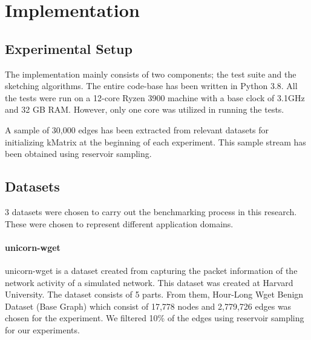 \section{Implementation}
\label{sec:implementation}

\subsection{Experimental Setup}

The implementation mainly consists of two components; the test suite and the sketching algorithms. The entire code-base has been written in Python 3.8. All the tests were run on a 12-core Ryzen 3900 machine with a base clock of 3.1GHz and 32 GB RAM. However, only one core was utilized in running the tests. 



A sample of 30,000 edges has been extracted from relevant datasets for initializing kMatrix at the beginning of each experiment. This sample stream has been obtained using reservoir sampling. 

\subsection{Datasets}

3 datasets were chosen to carry out the benchmarking process in this research. These were chosen to represent different application domains. 

\paragraph{unicorn-wget\cite{DVN/5H4TDI_2018}}
unicorn-wget is a dataset created from capturing the packet information of the network activity of a simulated network. This dataset was created at Harvard University. The dataset consists of 5 parts. From them, Hour-Long Wget Benign Dataset (Base Graph) which consist of 17,778 nodes and 2,779,726 edges was chosen for the experiment. We filtered 10\% of the edges using reservoir sampling for our experiments. 

